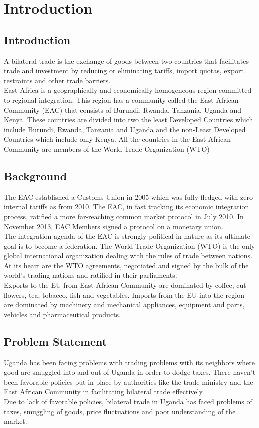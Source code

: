 \documentclass[12pt,a4paper]{article}
\begin{document}
\section{Introduction}
\subsection{Introduction}
A bilateral trade is the exchange of goods between two countries that facilitates trade and investment by reducing or eliminating tariffs, import quotas, export restraints and other trade barriers.\\
East Africa is a geographically and economically homogeneous region committed to regional integration. This region has a community called the East African Community (EAC) that consists of Burundi, Rwanda, Tanzania, Uganda and Kenya. These countries are divided into two the least Developed Countries which include Burundi, Rwanda, Tanzania and Uganda and the non-Least Developed Countries which include only Kenya. All the countries in the East African Community are members of the World Trade Organization (WTO)
\subsection{Background}
The EAC established a Customs Union in 2005 which was fully-fledged with zero internal tariffs as from 2010. The EAC, in fast tracking its economic integration process, ratified a more far-reaching common market protocol in July 2010. In November 2013, EAC Members signed a protocol on a monetary union.\\
The integration agenda of the EAC is strongly political in nature as its ultimate goal is to become a federation.
The World Trade Organization (WTO) is the only global international organization dealing with the rules of trade between nations. At its heart are the WTO agreements, negotiated and signed by the bulk of the world's trading nations and ratified in their parliaments.\\
Exports to the EU from East African Community are dominated by coffee, cut flowers, tea, tobacco, fish and vegetables.
Imports from the EU into the region are dominated by machinery and mechanical appliances, equipment and parts, vehicles and pharmaceutical products.
\subsection{Problem Statement}
Uganda has been facing problems with trading problems with its neighbors where good are smuggled into and out of Uganda in order to dodge taxes. There haven’t been favorable policies put in place by authorities like the trade ministry and the East African Community in facilitating bilateral trade effectively.\\
Due to lack of favorable policies, bilateral trade in Uganda has faced problems of taxes, smuggling of goods, price fluctuations and poor understanding of the market.
\end{document}
